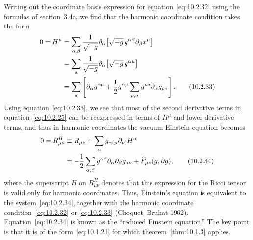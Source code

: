 Writing out the coordinate basis expression for equation~\eqref{eq:10.2.32} using
the formulas of section~3.4a, we find that the harmonic coordinate condition takes the
form
\begin{align}
  0=H^\mu
  &=\sum_{\alpha,\beta}\frac1{\sqrt{-g}}
    \partial_\alpha\!\left[\sqrt{-g}\,g^{\alpha\beta}
      \partial_\beta x^\mu\right] \notag\\
  &=\sum_\alpha\frac1{\sqrt{-g}}
    \partial_\alpha\!\left[\sqrt{-g}\,g^{\alpha\mu}\right] \notag\\
  &=\sum_\alpha\left[\partial_\alpha g^{\alpha\mu}
    +\frac12g^{\alpha\mu}\sum_{\rho,\sigma}
      g^{\rho\sigma}\partial_\alpha g_{\rho\sigma}\right].
  \tag{10.2.33}\label{eq:10.2.33}
\end{align}
Using equation~\eqref{eq:10.2.33}, we see that most of the second derivative terms
in equation~\eqref{eq:10.2.25} can be reexpressed in terms of \(H^\mu\) and lower
derivative terms, and thus in harmonic coordinates the vacuum Einstein equation
becomes
\begin{align}
  0=R^H_{\mu\nu}
  &\equiv R_{\mu\nu}+\sum_\alpha g_{\alpha(\mu}\partial_{\nu)}H^\alpha \notag\\
  &=-\frac12\sum_{\alpha,\beta}g^{\alpha\beta}
    \partial_\alpha\partial_\beta g_{\mu\nu}
    +\widehat F_{\mu\nu}(g,\partial g),
  \tag{10.2.34}\label{eq:10.2.34}
\end{align}
where the superscript \(H\) on \(R^H_{\mu\nu}\) denotes that this expression for the
Ricci tensor is valid only for harmonic coordinates. Thus, Einstein's equation is
equivalent to the system~\eqref{eq:10.2.34}, together with the harmonic coordinate
condition~\eqref{eq:10.2.32} or \eqref{eq:10.2.33} (Choquet--Bruhat 1962).
Equation~\eqref{eq:10.2.34} is known as the ``reduced Einstein equation.'' The key
point is that it is of the form~\eqref{eq:10.1.21} for which
theorem~\ref{thm:10.1.3} applies.

